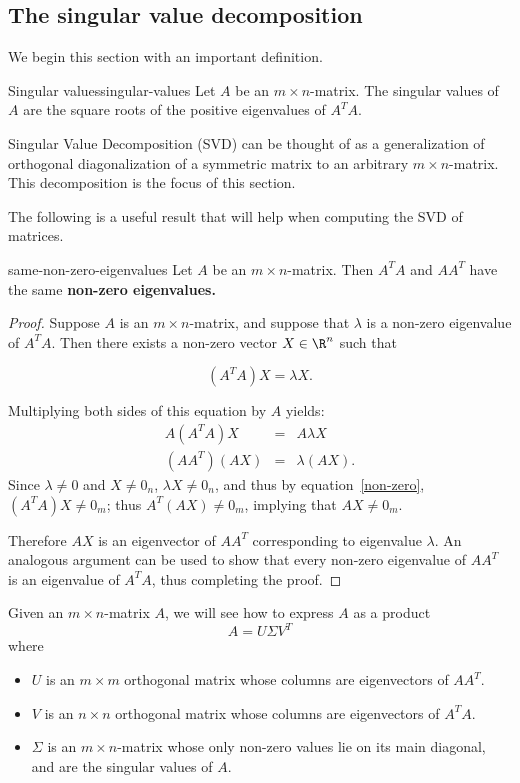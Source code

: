 \subsection{The singular value decomposition}

We begin this section with an important definition.

\begin{definition}{Singular values}{singular-values}
Let $A$ be an $m\times n$-matrix. The singular values of $A$ are the square roots of the positive
eigenvalues of $A^TA$.
\end{definition}

Singular Value Decomposition (SVD) can be thought of as 
a generalization of orthogonal diagonalization of a symmetric matrix
to an arbitrary $m\times n$-matrix. This decomposition is the focus of this section. 

The following is a useful result that will help when computing the SVD of matrices.

\begin{proposition}{}{same-non-zero-eigenvalues}
Let $A$ be an $m \times n$-matrix. Then $A^TA$ and $AA^T$ have the same \bf{non-zero} eigenvalues.
\end{proposition}

\begin{proof}
Suppose $A$ is an $m\times n$-matrix, and suppose that  $\lambda$ is a non-zero eigenvalue of $A^TA$.
Then there exists a non-zero vector $X\in \R^n$ such that

\begin{equation}\label{non-zero}
(A^TA)X=\lambda X.
\end{equation}

Multiplying both sides of this equation by $A$ yields:
\begin{eqnarray*}
A(A^TA)X & = & A\lambda X\\
(AA^T)(AX) & = & \lambda (AX).
\end{eqnarray*}
Since $\lambda\neq 0$ and $X\neq 0_n$, $\lambda X\neq 0_n$,
and thus by equation~\eqref{non-zero},
$(A^TA)X\neq 0_m$; thus $A^T(AX)\neq 0_m$, 
implying that $AX\neq 0_m$.

Therefore $AX$ is an eigenvector of $AA^T$ corresponding to eigenvalue
$\lambda$.  An analogous argument can be used to show that every
non-zero eigenvalue of $AA^T$ is an eigenvalue of $A^TA$, thus
completing the proof.
\end{proof}

Given an $m\times n$-matrix $A$, we will see how to express $A$ as a product
\[ A=U\Sigma V^T\]
where
\begin{itemize}
\item $U$ is an $m\times m$ orthogonal matrix whose columns are
eigenvectors of $AA^T$.
\item $V$ is an $n\times n$ orthogonal matrix whose columns are
eigenvectors of $A^TA$.
\item $\Sigma$ is an $m\times n$-matrix whose only non-zero values
lie on its main diagonal, and are the singular values of $A$.
\end{itemize}


